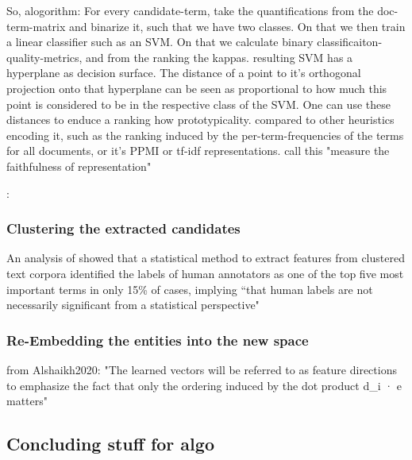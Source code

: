 So, alogorithm: For every candidate-term, take the quantifications from the doc-term-matrix and binarize it, such that we have two classes. On that we then train a linear classifier such as an SVM. On that we calculate binary classificaiton-quality-metrics, and from the ranking the kappas. resulting SVM has a hyperplane as decision surface. The distance of a point to it's orthogonal projection onto that hyperplane can be seen as proportional to how much this point is considered to be in the respective class of the SVM. One can use these distances to enduce a ranking how prototypicality. compared to other heuristics encoding it, such as the ranking induced by the per-term-frequencies of the terms for all documents, or it's PPMI or tf-idf representations.
\cite{Derrac2015} call this "measure the faithfulness of representation"

\cite{Ager2018}: 



\subsubsection{Clustering the extracted candidates}

An analysis of \cite{Carmel2009} showed that a statistical method to extract features from clustered text corpora identified the labels of human annotators as one of the top five most important terms in only 15\% of cases, implying ``that human labels are not necessarily significant from a statistical perspective" \cite[139]{Carmel2009}


\subsubsection{Re-Embedding the entities into the new space}

from Alshaikh2020: "The learned vectors will be referred to as feature directions to emphasize the fact that only the ordering induced by the dot product d_i · e matters"


\subsection{Concluding stuff for algo}

